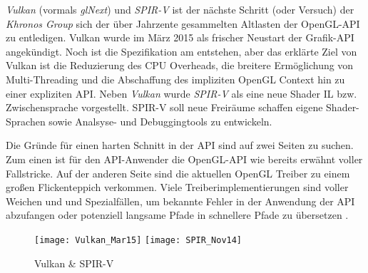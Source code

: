 \textit{Vulkan} (vormals \textit{glNext}) und \textit{SPIR-V} ist der nächste Schritt (oder Versuch) der \textit{Khronos Group} sich der über Jahrzente gesammelten Altlasten der OpenGL-API zu entledigen. Vulkan wurde im März 2015 als frischer Neustart der Grafik-API angekündigt. Noch ist die Spezifikation am entstehen, aber das erklärte Ziel von Vulkan ist die Reduzierung des CPU Overheads, die breitere Ermöglichung von Multi-Threading und die Abschaffung des impliziten OpenGL Context hin zu einer expliziten API. Neben \textit{Vulkan} wurde \textit{SPIR-V} als eine neue Shader \ac{IL} bzw. Zwischensprache vorgestellt. SPIR-V soll neue Freiräume schaffen eigene Shader-Sprachen sowie Analsyse- und Debuggingtools zu entwickeln\parencite{Olson2015}.

Die Gründe für einen harten Schnitt in der API sind auf zwei Seiten zu suchen. Zum einen ist für den API-Anwender die OpenGL-API wie bereits erwähnt voller Fallstricke. Auf der anderen Seite sind die aktuellen OpenGL Treiber zu einem großen Flickenteppich verkommen. Viele Treiberimplementierungen sind voller Weichen und und Spezialfällen, um bekannte Fehler in der Anwendung der API abzufangen oder potenziell langsame Pfade in schnellere Pfade zu übersetzen \parencite{gamedevnet:glnext}.

\begin{figure}
	\label{fig:microfacet}
	\texttt{[image: Vulkan\_Mar15]}
	\texttt{[image: SPIR\_Nov14]}
	\caption{Vulkan \& SPIR-V}
\end{figure}


